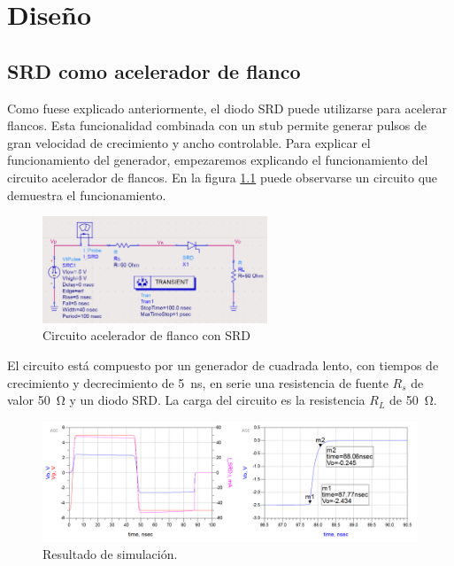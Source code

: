 \chapter{Diseño}

\section{SRD como acelerador de flanco}
\label{sec:srd_sharpener}

Como fuese explicado anteriormente, el diodo SRD puede utilizarse para acelerar
flancos. Esta funcionalidad combinada con un stub permite generar pulsos de gran
velocidad de crecimiento y ancho controlable. Para explicar el funcionamiento
del generador, empezaremos explicando el funcionamiento del circuito acelerador
de flancos. En la figura \ref{fig:srd_sharpener} puede observarse un circuito
que demuestra el funcionamiento.

\begin{figure}
  \centering
    \includegraphics[width=0.6\textwidth]{images/srd_sharpener_circuit.png}
    \caption{Circuito acelerador de flanco con SRD}
    \label{fig:srd_sharpener}
\end{figure}

El circuito está compuesto por un generador de cuadrada lento, con tiempos de
crecimiento y decrecimiento de \qty{5}{\nano\second}, en serie una resistencia
de fuente $R_s$ de valor \qty{50}{\ohm} y un diodo SRD. La carga del circuito es
la resistencia $R_L$ de \qty{50}{\ohm}.

\begin{figure}[tbp]
    \centering
    \includegraphics[width=\textwidth]{images/srd_sharpener_result.png}
    \caption{Resultado de simulación.}
    \label{fig:srd_sharpener_result}
\end{figure}

